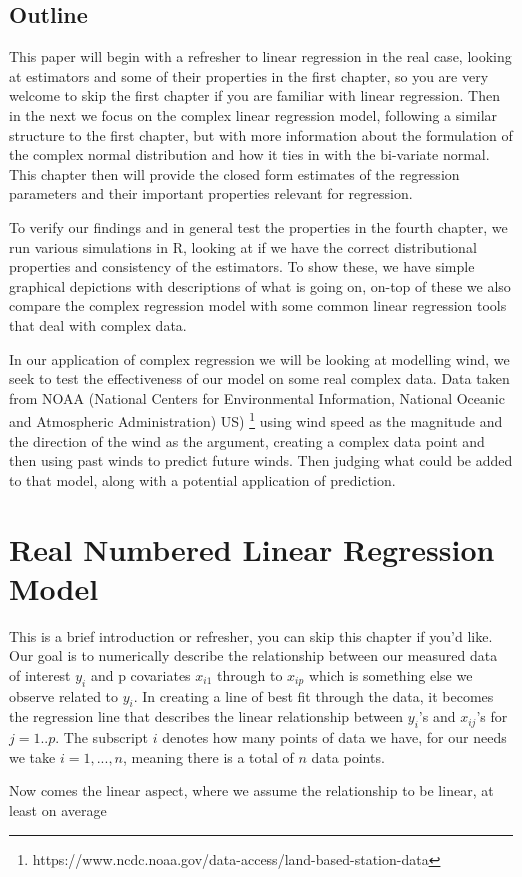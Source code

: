 \documentclass[honours,12pt]{unswthesis}
\numberwithin{equation}{section}
\begin{document}
 
\section{Outline}

This paper will begin with a refresher to linear regression in the real case, looking at estimators and some of their properties in the first chapter, so you are very welcome to skip the first chapter if you are familiar with linear regression. Then in the next we focus on the complex linear regression model, following a similar structure to the first chapter, but with more information about the formulation of the complex normal distribution and how it ties in with the bi-variate normal. This chapter then will provide the closed form estimates of the regression parameters and their important properties relevant for regression. \par
To verify our findings and in general test the properties in the fourth chapter, we run various simulations in R, looking at if we have the correct distributional properties and consistency of the estimators. To show these, we have simple graphical depictions with descriptions of what is going on, on-top of these we also compare the complex regression model with some common linear regression tools that deal with complex data.\par
In our application of complex regression we will be looking at modelling wind, we seek to test the effectiveness of our model on some real complex data. Data taken from NOAA (National Centers for Environmental Information, National Oceanic and Atmospheric Administration) US) \footnote{https://www.ncdc.noaa.gov/data-access/land-based-station-data} using wind speed as the magnitude and the direction of the wind as the argument, creating a complex data point \cite{yan2012} \cite{mandic2009} and then using past winds to predict future winds. Then judging what could be added to that model, along with a potential application of prediction.


\chapter{Real Numbered Linear Regression Model}

This is a brief introduction or refresher, you can skip this chapter if you'd like. Our goal is to numerically describe the relationship between our measured data of interest $y_{i}$ and p covariates $x_{i1}$ through to $x_{ip}$ which is something else we observe related to $y_{i}$. In creating a line of best fit through the data, it becomes the regression line that describes the linear relationship between $y_{i}$'s and $x_{ij}$'s for $j = 1..p$. The subscript $i$ denotes how many points of data we have,  for our needs we take $i = 1,...,n$, meaning there is a total of $n$ data points. \par 
Now comes the linear aspect, where we assume the relationship to be linear, at least on average
\end{document}

